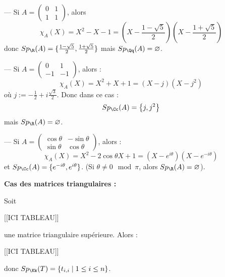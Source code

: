 \documentclass[class=report,crop=false]{standalone}
\newcommand{\Sp}{Sp}
\begin{document}
\begin{exemple}[s]

--- Si $A = \left(\begin{array}{cc}
0 & 1\\
1 &1
\end{array}\right)$, alors \[\chi_A(X) = X^2 -X -1 = (X-\frac{1-\sqrt{5}}{2})(X-\frac{1+\sqrt{5}}{2})\]
donc $\Sp_\R(A) = \{\frac{1-\sqrt{5}}{2}, \frac{1+\sqrt{5}}{2}\}$ mais $\Sp_\Qq(A) = \varnothing$.

--- Si $A =  \left(\begin{array}{cc}
0 & 1\\
-1 &-1
\end{array}\right)$, alors :
\[\chi_A(X) = X^2 + X +1 = (X-j)(X-j^2)\]
où $j := -\frac{1}{2}+i\frac{\sqrt{3}}{2}$. Donc dans ce cas :
\[\Sp_\Cc(A) = \left\{j,j^2\right\}\]
mais $\Sp_\R(A) = \varnothing$.

--- Si $A= \left(\begin{array}{cc}
\cos \theta & -\sin \theta\\
\sin \theta &\cos \theta
\end{array}\right)$, alors :
\[\chi_A(X) = X^2-2\cos \theta X +1 = (X-e^{i\theta}) (X-e^{-i\theta})\]
et $\Sp_\Cc(A) = \{e^{-i\theta},e^{i\theta}\}$. (Si $\theta \neq 0 \mod \pi$, alors $\Sp_\R(A) =\varnothing$). 
\end{exemple}

{\bf Cas des matrices triangulaires :}

Soit

[[ICI TABLEAU]]



une matrice triangulaire supérieure. Alors :

[[ICI TABLEAU]]
%


donc $\Sp_\Kk(T) = \left\{t_{i,i} \mid 1\le i \le n\right\}$.
\end{document}
